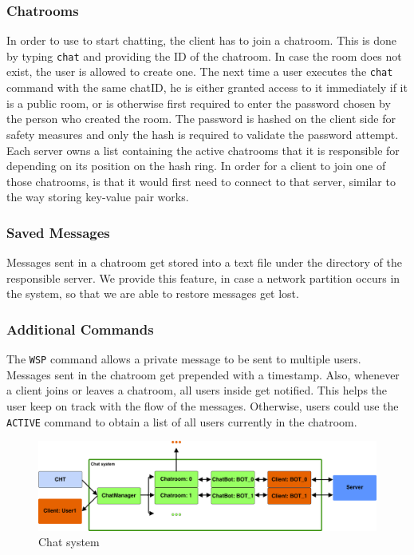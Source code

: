 \subsubsection{Chatrooms}
\label{sec:groupchat_funtionalities_chatcommand}
In order to use to start chatting, the client has to join a chatroom. This is done by typing \texttt{chat} and providing the ID of the chatroom. In case the room does not exist, the user is allowed to create one. The next time a user executes the \texttt{chat} command with the same chatID, he is either granted access to it immediately if it is a public room, or is otherwise first required to enter the password chosen by the person who created the room. The password is hashed on the client side for safety measures and only the hash is required to validate the password attempt.
Each server owns a list containing the active chatrooms that it is responsible for depending on its position on the hash ring. In order for a client to join one of those chatrooms, is that it would first need to connect to that server, similar to the way storing key-value pair works.

\subsubsection{Saved Messages}
\label{sec:groupchat_funtionalities_savedmessages}
Messages sent in a chatroom get stored into a text file under the directory of the responsible server. We provide this feature, in case a network partition occurs in the system, so that we are able to restore messages get lost.

\subsubsection{Additional Commands}
\label{sec:groupchat_funtionalities_commands}
The \texttt{WSP} command allows a private message to be sent to multiple users.
Messages sent in the chatroom get prepended with a timestamp. Also, whenever a client joins or leaves a chatroom, all users inside get notified. This helps the user keep on track with the flow of the messages. Otherwise, users could use the \texttt{ACTIVE} command to obtain a list of all users currently in the chatroom. 

\begin{figure}[h]
	\centering
	\includegraphics[width=\linewidth]{figures/chat/chat_arch.png}
	\caption{Chat system}
\end{figure}

